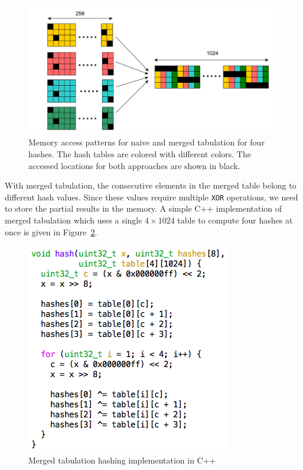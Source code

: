 \documentclass[10pt, conference, compsocconf]{IEEEtran}
\begin{document}
 \begin{figure}[htbp]
\begin{center}
\includegraphics[width=0.96\linewidth]{merged_tabular_access.pdf}
\caption{Memory access patterns for naive and merged tabulation for four hashes. The hash tables are colored with different colors. The accessed locations for both approaches are shown in black.}
\label{fig:merged_tabular_access}
\end{center}
\end{figure}

With merged tabulation, the consecutive elements in the merged table belong to different hash values. Since these values require multiple {\tt XOR} operations, we need to store the partial results in the memory. A simple C++ implementation of merged tabulation which uses a single $4 \times 1024$ table to compute four hashes at once is given in Figure~\ref{fig:tabulation_merged}.

\begin{figure}[htbp]
\begin{center}
\includegraphics[width=0.75\linewidth]{tabular_code_par}
\caption{Merged tabulation hashing implementation in C++}
\label{fig:tabulation_merged}
\end{center}
\end{figure}
\end{document}
